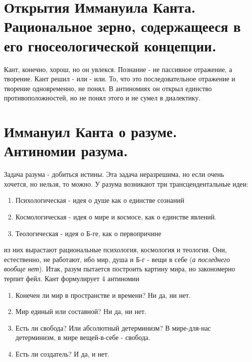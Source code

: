 \section{Открытия Иммануила Канта. Рациональное зерно, содержащееся в его гносеологической концепции.}
Кант, конечно, хорош, но он увлекся. Познание - не пассивное отражение, а творение. Кант решил - или - или. То, что это последовательное отражение и творение одновременно, не понял.  В антиномиях он открыл единство противоположностей, но не понял этого и не сумел в диалектику.

\section{Иммануил Канта о разуме. Антиномии разума.}
Задача разума - добиться истины. Эта задача неразрешима, но если очень хочется, но нельзя, то можно. У разума возникают три трансцендентальные идеи:
\begin{enumerate}
\item Психологическая - идея о душе как о единстве сознаний
\item Космологическая - идея о мире и космосе, как о единстве явлений.
\item Теологическая - идея о Б-ге, как о первопричине
\end{enumerate}
из них вырастают рациональные психология, космология и теология. Они, естественно, не работают, ибо мир, душа и Б-г - вещи в себе (\textit{а последнего вообще нет}).
Итак, разум пытается построить картину мира, но закономерно терпит фейл. Кант формулирует 4 антиномии
\begin{enumerate}
\item Конечен ли мир в пространстве и времени? Ни да, ни нет.
\item Мир единый или составной? Ни да, ни нет.
\item Есть ли свобода? Или абсолютный детерминизм? В мире-для-нас детерминизм, в мире вещей-в-себе - свобода. 
\item Есть ли создатель? И да, и нет.
\end{enumerate}

